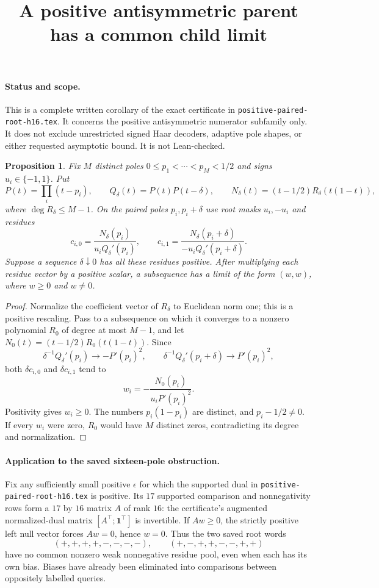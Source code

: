 \documentclass[11pt]{article}
\title{A positive antisymmetric parent has a common child limit}
\author{}\date{}
\newtheorem{proposition}{Proposition}
\begin{document}
\maketitle
\paragraph{Status and scope.}
This is a complete written corollary of the exact certificate in
\texttt{positive-paired-root-h16.tex}. It concerns the positive
antisymmetric numerator subfamily only. It does not exclude unrestricted
signed Haar decoders, adaptive pole shapes, or either requested
asymptotic bound. It is not Lean-checked.

\begin{proposition}
Fix $M$ distinct poles $0\leq p_1<\cdots<p_M<1/2$ and signs
$u_i\in\{-1,1\}$. Put
\[
 P(t)=\prod_i(t-p_i),\qquad
 Q_\delta(t)=P(t)P(t-\delta),\qquad
 N_\delta(t)=(t-1/2)R_\delta(t(1-t)),
\]
where $\deg R_\delta\leq M-1$. On the paired poles $p_i,p_i+\delta$
use root masks $u_i,-u_i$ and residues
\[
 c_{i,0}=\frac{N_\delta(p_i)}{u_iQ_\delta'(p_i)},
 \qquad
 c_{i,1}=\frac{N_\delta(p_i+\delta)}{-u_iQ_\delta'(p_i+\delta)}.
\]
Suppose a sequence $\delta\downarrow0$ has all these residues positive.
After multiplying each residue vector by a positive scalar, a subsequence
has a limit of the form $(w,w)$, where $w\geq0$ and $w\ne0$.
\end{proposition}
\begin{proof}
Normalize the coefficient vector of $R_\delta$ to Euclidean norm one;
this is a positive rescaling. Pass to a subsequence on which it converges
to a nonzero polynomial $R_0$ of degree at most $M-1$, and let
$N_0(t)=(t-1/2)R_0(t(1-t))$. Since
\[
 \delta^{-1}Q_\delta'(p_i)\longrightarrow-P'(p_i)^2,
 \qquad
 \delta^{-1}Q_\delta'(p_i+\delta)\longrightarrow P'(p_i)^2,
\]
both $\delta c_{i,0}$ and $\delta c_{i,1}$ tend to
\[
 w_i=-\frac{N_0(p_i)}{u_iP'(p_i)^2}.
\]
Positivity gives $w_i\geq0$. The numbers $p_i(1-p_i)$ are distinct,
and $p_i-1/2\ne0$. If every $w_i$ were zero, $R_0$ would have $M$
distinct zeros, contradicting its degree and normalization.
\end{proof}

\paragraph{Application to the saved sixteen-pole obstruction.}
Fix any sufficiently small positive $\epsilon$ for which the supported
dual in \texttt{positive-paired-root-h16.tex} is positive. Its $17$
supported comparison and nonnegativity rows form a $17$ by $16$
matrix $A$ of rank $16$: the certificate's augmented normalized-dual
matrix $[A^\top;\mathbf1^\top]$ is invertible. If $Aw\geq0$, the
strictly positive left null vector forces $Aw=0$, hence $w=0$.
Thus the two saved root words
\[
 (+,+,+,+,-,-,-,-),\qquad (+,-,+,+,-,-,+,+)
\]
have no common nonzero weak nonnegative residue pool, even when each
has its own bias. Biases have already been eliminated into comparisons
between oppositely labelled queries.
\end{document}
